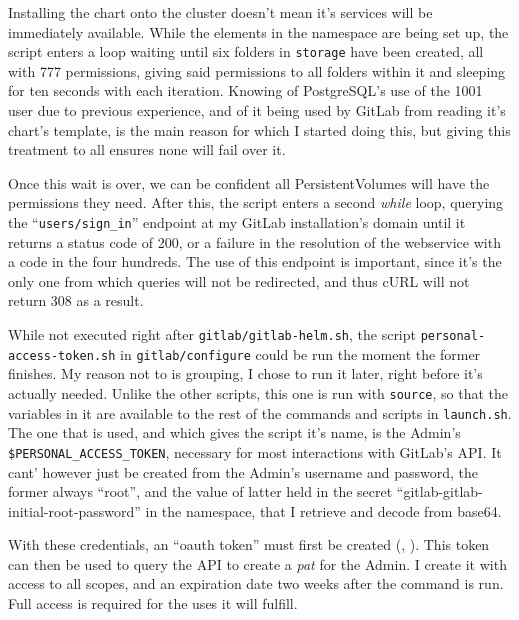 \documentclass[11pt]{article}
\begin{document}
\begin{flushleft}
    Installing the chart onto the cluster doesn't mean it's services will be immediately available. While the elements in the namespace are being set up, the script enters a loop waiting until six folders in \texttt{storage} have been created, all with 777 permissions, giving said permissions to all folders within it and sleeping for ten seconds with each iteration. Knowing of PostgreSQL's use of the 1001 user due to previous experience, and of it being used by GitLab from reading it's chart's template, is the main reason for which I started doing this, but giving this treatment to all ensures none will fail over it. 
    \linebreak
    
    Once this wait is over, we can be confident all PersistentVolumes will have the permissions they need. After this, the script enters a second \textit{while} loop, querying the ``\texttt{users/sign\_in}'' endpoint at my GitLab installation's domain until it returns a status code of 200, or a failure in the resolution of the webservice with a code in the four hundreds. The use of this endpoint is important, since it's the only one from which queries will not be redirected, and thus cURL will not return 308 as a result.
    \linebreak
            
    While not executed right after \texttt{gitlab/gitlab-helm.sh}, the script \texttt{personal-access-token.sh} in \texttt{gitlab/configure} could be run the moment the former finishes. My reason not to is grouping, I chose to run it later, right before it's actually needed. Unlike the other scripts, this one is run with \texttt{source}, so that the variables in it are available to the rest of the commands and scripts in \texttt{launch.sh}. The one that is used, and which gives the script it's name, is the Admin's \texttt{\$PERSONAL\_ACCESS\_TOKEN}, necessary for most interactions with GitLab's API. It cant' however just be created from the Admin's username and password, the former always ``root'', and the value of latter held in the secret ``gitlab-gitlab-initial-root-password'' in the namespace, that I retrieve and decode from base64. 
    \linebreak
    
    With these credentials, an ``oauth token'' must first be created (\cite{gitlabpat}, \cite{gitlabpatusers}). This token can then be used to query the API to create a \textit{\acrshort{pat}} for the Admin. I create it with access to all scopes, and an expiration date two weeks after the command is run. Full access is required for the uses it will fulfill.
    \linebreak
        

\end{flushleft}
\end{document}
